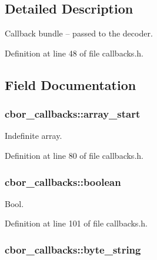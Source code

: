 \subsection{Detailed Description}
Callback bundle -- passed to the decoder. 

Definition at line 48 of file callbacks.\-h.



\subsection{Field Documentation}
\hypertarget{structcbor__callbacks_affebd3296749cdc0d564a3b9cae7a4e4}{
\subsubsection[{array\-\_\-start}]{ cbor\-\_\-callbacks\-::array\-\_\-start}}\label{structcbor__callbacks_affebd3296749cdc0d564a3b9cae7a4e4}


Indefinite array. 



Definition at line 80 of file callbacks.\-h.

\hypertarget{structcbor__callbacks_a458321ece8c64be2c37b96f78bbdfb8c}{
\subsubsection[{boolean}]{ cbor\-\_\-callbacks\-::boolean}}\label{structcbor__callbacks_a458321ece8c64be2c37b96f78bbdfb8c}


Bool. 



Definition at line 101 of file callbacks.\-h.

\hypertarget{structcbor__callbacks_a0c2528e2b1d6df97053168d24e53e278}{
\subsubsection[{byte\-\_\-string}]{ cbor\-\_\-callbacks\-::byte\-\_\-string}}\label{structcbor__callbacks_a0c2528e2b1d6df97053168d24e53e278}


